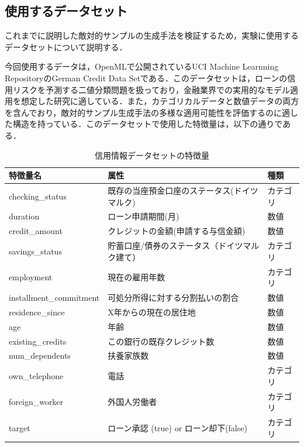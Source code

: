 \subsection{使用するデータセット}
これまでに説明した敵対的サンプルの生成手法を検証するため，実験に使用するデータセットについて説明する．

今回使用するデータは，OpenMLで公開されているUCI Machine Learnning RepositoryのGerman Credit Data Setである．\cite{credit-g}このデータセットは，ローンの信用リスクを予測する二値分類問題を扱っており，金融業界での実用的なモデル適用を想定した研究に適している．また，カテゴリカルデータと数値データの両方を含んでおり，敵対的サンプル生成手法の多様な適用可能性を評価するのに適した構造を持っている．このデータセットで使用した特徴量は，以下の通りである．

\begin{table}[H]
    \centering
    \caption{信用情報データセットの特徴量}
    \begin{tabular}{|l|l|l|}
        \hline
        特徴量名 & 属性 & 種類 \\ \hline
        checking\_status & 既存の当座預金口座のステータス(ドイツマルク) & カテゴリ \\ \hline
        duration & ローン申請期間(月) & 数値 \\ \hline
        credit\_amount & クレジットの金額(申請する与信金額) & 数値 \\ \hline
        savings\_status & 貯蓄口座/債券のステータス（ドイツマルク建て） & カテゴリ \\ \hline
        employment & 現在の雇用年数 & カテゴリ \\ \hline
        installment\_commitment & 可処分所得に対する分割払いの割合 & 数値 \\ \hline
        residence\_since & X年からの現在の居住地 & 数値 \\ \hline
        age & 年齢 & 数値 \\ \hline
        existing\_credits & この銀行の既存クレジット数 & 数値 \\ \hline
        num\_dependents & 扶養家族数 & 数値 \\ \hline
        own\_telephone & 電話 & カテゴリ \\ \hline
        foreign\_worker & 外国人労働者 & カテゴリ \\ \hline
        target & ローン承認 (true) or ローン却下(false) & カテゴリ \\ \hline
    \end{tabular}
    \label{tab:credit_g_features}
\end{table}

